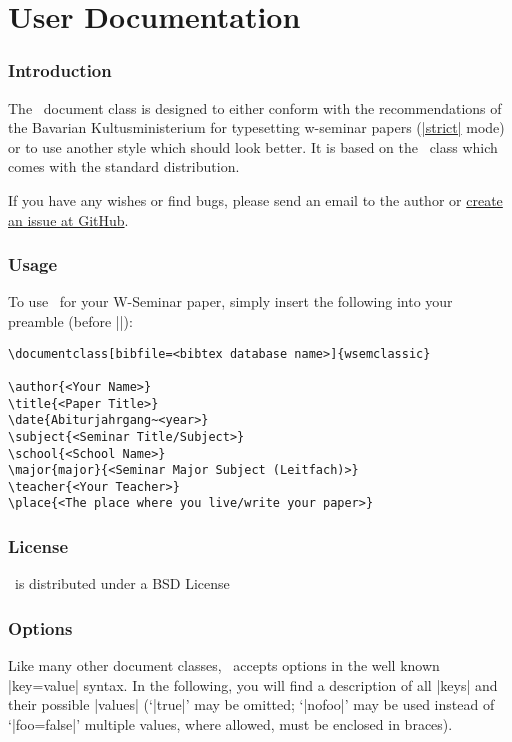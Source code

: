 \part{User Documentation}


\section{Introduction}

The \wsemclassic\ document class is designed to either conform with the
recommendations of the Bavarian Kultusministerium for typesetting
w-seminar papers (\hyperlink{udoc.opt.strict}{|strict|} mode) or to use another
style which should look better. It is based on the \report\ class which
comes with the standard  distribution.

If you have any wishes or find bugs, please send an email to the author or
\href{https://github.com/jorsn/wsemclassic/issues}{create an issue at GitHub}.


\section{Usage}

To use \wsemclassic\ for your W-Seminar paper, simply insert the following into your
 preamble (before ||):

\begin{verbatim}
\documentclass[bibfile=<bibtex database name>]{wsemclassic}

\author{<Your Name>}
\title{<Paper Title>}
\date{Abiturjahrgang~<year>}
\subject{<Seminar Title/Subject>}
\school{<School Name>}
\major{major}{<Seminar Major Subject (Leitfach)>}
\teacher{<Your Teacher>}
\place{<The place where you live/write your paper>}
\end{verbatim}


\section{License}

\wsemclassic\ is distributed under a BSD License

\hypertarget{sec.options}{\section{Options}}

Like many other  document classes, \wsemclassic\ accepts options in
the well known |key=value| syntax. In the following, you will find a
description of all |keys| and their possible |values|
(`|true|' may be omitted; `|nofoo|' may be used instead of `|foo=false|' multiple
values, where allowed, must be enclosed in braces).

